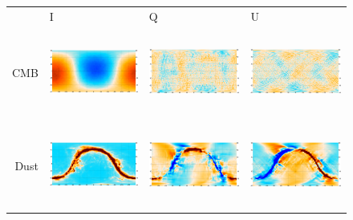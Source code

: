 \documentclass{article}
\begin{document}
\begin{figure}
	\centering
	\hspace*{-15mm}\begin{tabular}{rm{56mm}m{54.4mm}m{56mm}}
		& \hspace{32mm}I & \hspace{32mm}Q & \hspace{32mm}U \\
		CMB &
		\includegraphics[height=28mm,clip,trim=0 8mm 7.5mm 0]{plots/sim_freqmap_58GHz_1_0.png} &
		\includegraphics[height=28mm,clip,trim=7.5mm 8mm 7.5mm 0]{plots/sim_freqmap_58GHz_1_1.png} &
		\includegraphics[height=28mm,clip,trim=7.5mm 8mm 0 0]{plots/sim_freqmap_58GHz_1_2.png} \\
		Dust &
		\includegraphics[height=28mm,clip,trim=0 8mm 7.5mm 0]{plots/sim_freqmap_58GHz_2_0.png} &
		\includegraphics[height=28mm,clip,trim=7.5mm 8mm 7.5mm 0]{plots/sim_freqmap_58GHz_2_1.png} &
		\includegraphics[height=28mm,clip,trim=7.5mm 8mm 0 0]{plots/sim_freqmap_58GHz_2_2.png} \\

\end{tabular}
\end{figure}
\end{document}
